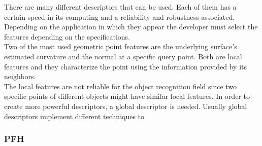 There are many different descriptors that can be used. Each of them has a certain speed in its computing and a reliability and robustness associated. Depending on the application in which they appear the developer must select the features depending on the specifications. 
\\

Two of the most used geometric point features are the underlying surface's estimated curvature and the normal at a specific query point. Both are local features and they characterize the point using the information provided by its neighbors. \\

The local features are not reliable for the object recognition field since two specific points of different objects might have similar local features. In order to create more powerful descriptors, a global descriptor is needed. Usually global descriptors implement different techniques to 


\subsubsection{PFH}
\label{pfh}
